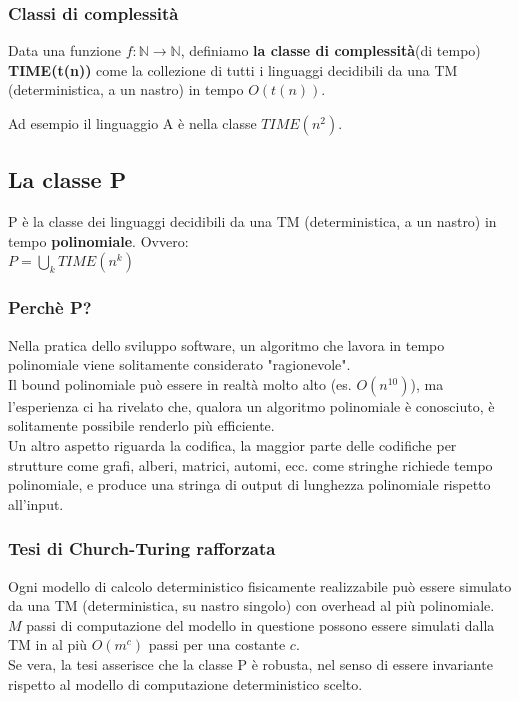 \documentclass[a4paper, 12pt]{article}
\begin{document}
\subsubsection{Classi di complessit\`a}
\begin{center}
Data una funzione $f: \mathbb{N} \rightarrow \mathbb{N}$, definiamo \textbf{la classe di complessit\`a}(di tempo) \textbf{TIME(t(n))} come la collezione di tutti i linguaggi decidibili da una TM (deterministica, a un nastro) in tempo $O(t(n))$.
\end{center}
Ad esempio il linguaggio A \`e nella classe $TIME(n^{2})$.
\subsection{La classe P}
\begin{center}
P \`e la classe dei linguaggi decidibili da una TM (deterministica, a un nastro) in tempo \textbf{polinomiale}. Ovvero:\\
$P = \bigcup_{k} TIME(n^{k})$
\end{center}
\subsubsection{Perch\`e P?}
Nella pratica dello sviluppo software, un algoritmo che lavora in tempo polinomiale viene solitamente considerato "ragionevole".\\ Il bound polinomiale pu\`o essere in realt\`a molto alto (es. $O(n^{10})$), ma l'esperienza ci ha rivelato che, qualora un algoritmo polinomiale \`e conosciuto, \`e solitamente possibile renderlo pi\`u efficiente.\\Un altro aspetto riguarda la codifica, la maggior parte delle codifiche per strutture come grafi, alberi, matrici, automi, ecc. come stringhe richiede tempo polinomiale, e produce una stringa di output di lunghezza polinomiale rispetto all'input.
\subsubsection{Tesi di Church-Turing rafforzata}
Ogni modello di calcolo deterministico fisicamente realizzabile pu\`o essere simulato da una TM (deterministica, su nastro singolo) con overhead al pi\`u polinomiale.\\
$M$ passi di computazione del modello in questione possono essere simulati dalla TM in al pi\`u $O(m^{c})$ passi per una costante $c$.\\
Se vera, la tesi asserisce che la classe P \`e robusta, nel senso di essere invariante rispetto al modello di computazione deterministico scelto.
\end{document}
